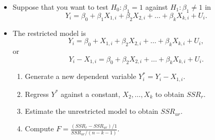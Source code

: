 \documentclass[notes=show,compress,beamer]{beamer}
\begin{document}
\begin{frame}%


\begin{itemize}
\item Suppose that you want to test $H_{0}:\beta _{1}=1$ against $%
H_{1}:\beta _{1}\neq 1$ in%
\begin{equation*}
Y_{i}=\beta _{0}+\beta _{1}X_{1,i}+\beta _{2}X_{2,i}+\ldots +\beta
_{k}X_{k,i}+U_{i}.
\end{equation*}%
\pause%

\item The 
\color{red}%
restricted 
\color{black}%
model is%
\begin{equation*}
Y_{i}=\beta _{0}+X_{1,i}+\beta _{2}X_{2,i}+\ldots +\beta _{k}X_{k,i}+U_{i},
\end{equation*}%
\pause%
or%
\begin{equation*}
Y_{i}-X_{1,i}=\beta _{0}+\beta _{2}X_{2,i}+\ldots +\beta _{k}X_{k,i}+U_{i}.
\end{equation*}%
\pause%

\begin{enumerate}
\item Generate a new dependent variable $Y_{i}^{\ast }=Y_{i}-X_{1,i}.$%
\pause%

\item Regress $Y^{\ast }$ against a constant, $X_{2},\ldots ,X_{k}$ to
obtain $SSR_{r}.$%
\pause%

\item Estimate the unrestricted model to obtain $SSR_{ur}.$%
\pause%

\item Compute $F=\frac{\left( SSR_{r}-SSR_{ur}\right) /1}{SSR_{ur}/\left(
n-k-1\right) }.$
\end{enumerate}
\end{itemize}

\end{frame}%
\end{document}
